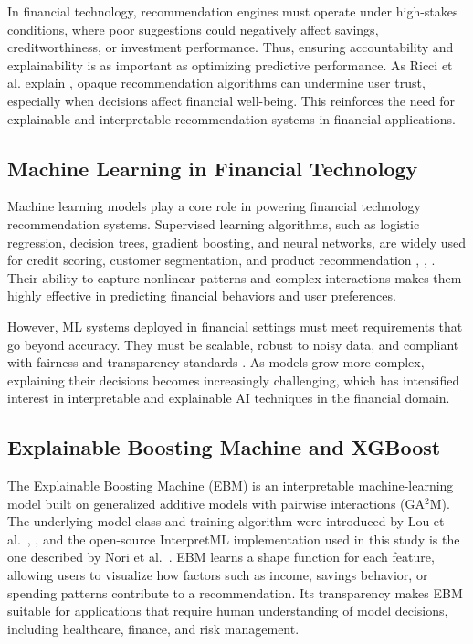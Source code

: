 \documentclass{icsthesis}
\begin{document}
\begin{mainmatter}
                In financial technology, recommendation engines must operate under high-stakes conditions, where poor suggestions could negatively affect savings, creditworthiness, or investment performance. Thus, ensuring accountability and explainability is as important as optimizing predictive performance. As Ricci et al. explain \cite{ref13}, opaque recommendation algorithms can undermine user trust, especially when decisions affect financial well-being. This reinforces the need for explainable and interpretable recommendation systems in financial applications.

			\subsection{Machine Learning in Financial Technology}
				Machine learning models play a core role in powering financial technology recommendation systems. Supervised learning algorithms, such as logistic regression, decision trees, gradient boosting, and neural networks, are widely used for credit scoring, customer segmentation, and product recommendation \cite{ref11}, \cite{ref14}, \cite{ref56}. Their ability to capture nonlinear patterns and complex interactions makes them highly effective in predicting financial behaviors and user preferences.

                However, ML systems deployed in financial settings must meet requirements that go beyond accuracy. They must be scalable, robust to noisy data, and compliant with fairness and transparency standards \cite{ref14}. As models grow more complex, explaining their decisions becomes increasingly challenging, which has intensified interest in interpretable and explainable AI techniques in the financial domain.

			\subsection{Explainable Boosting Machine and XGBoost}
				The Explainable Boosting Machine (EBM) is an interpretable machine-learning model built on generalized additive models with pairwise interactions (GA$^2$M). The underlying model class and training algorithm were introduced by Lou et al.\ \cite{ref48}, \cite{ref49}, and the open-source InterpretML implementation used in this study is the one described by Nori et al.\ \cite{ref15}. EBM learns a shape function for each feature, allowing users to visualize how factors such as income, savings behavior, or spending patterns contribute to a recommendation. Its transparency makes EBM suitable for applications that require human understanding of model decisions, including healthcare, finance, and risk management.


\end{mainmatter}
\end{document}
